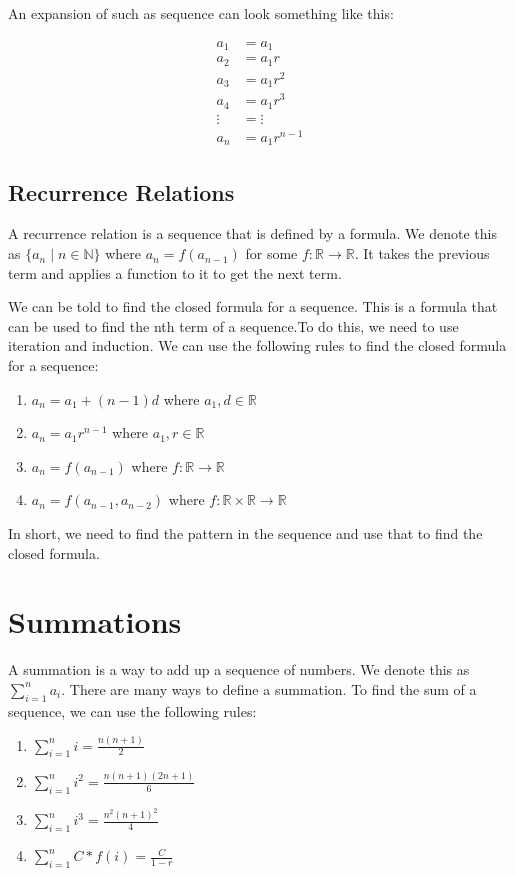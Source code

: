 \documentclass[11pt]{article}
\begin{document}
An expansion of such as sequence can look something like this:

\begin{align}
a_1 &= a_1 \\
a_2 &= a_1 r \\
a_3 &= a_1 r^2 \\
a_4 &= a_1 r^3 \\
\vdots &= \vdots \\
a_n &= a_1 r^{n-1}
\end{align}

\subsection{Recurrence Relations}
\label{sec:org1bd5f43}
A recurrence relation is a sequence that is defined by a formula. We denote this as \(\{a_n \mid n \in \mathbb{N}\}\) where \(a_n = f(a_{n-1})\) for some \(f: \mathbb{R} \rightarrow \mathbb{R}\). It takes the previous term and applies a function to it to get the next term.

We can be told to find the closed formula for a sequence. This is a formula that can be used to find the nth term of a sequence.To do this, we need to use iteration and induction. We can use the following rules to find the closed formula for a sequence:
\begin{enumerate}
\item \(a_n = a_1 + (n-1)d\) where \(a_1, d \in \mathbb{R}\)
\item \(a_n = a_1 r^{n-1}\) where \(a_1, r \in \mathbb{R}\)
\item \(a_n = f(a_{n-1})\) where \(f: \mathbb{R} \rightarrow \mathbb{R}\)
\item \(a_n = f(a_{n-1}, a_{n-2})\) where \(f: \mathbb{R} \times \mathbb{R} \rightarrow \mathbb{R}\)
\end{enumerate}

In short, we need to find the pattern in the sequence and use that to find the closed formula.

\section{Summations}
\label{sec:org835f74b}
A summation is a way to add up a sequence of numbers. We denote this as \(\sum_{i=1}^n a_i\). There are many ways to define a summation. To find the sum of a sequence, we can use the following rules:
\begin{enumerate}
\item \(\sum_{i=1}^n i = \frac{n(n+1)}{2}\)
\item \(\sum_{i=1}^n i^2 = \frac{n(n+1)(2n+1)}{6}\)
\item \(\sum_{i=1}^n i^3 = \frac{n^2(n+1)^2}{4}\)
\item \(\sum_{i=1}^n C * f(i) = \frac{C}{1-r}\)
\end{enumerate}
\end{document}
